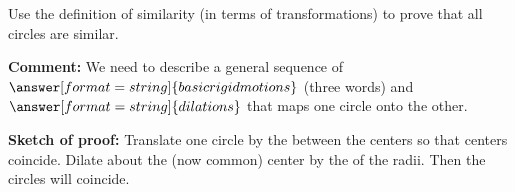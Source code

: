 \documentclass[nooutcomes]{ximera}
\begin{document}
%

%

\begin{question}
Use the definition of similarity (in terms of transformations) to prove that all circles are similar.  

\textbf{Comment:} We need to describe a general sequence of 
$\answer[format=string]{basic rigid motions}$ 
(three words) and $\answer[format=string]{dilations}$ that maps one circle onto the other.  

\begin{question}
\textbf{Sketch of proof:}  Translate one circle by the 
between the centers so that centers coincide.  Dilate about the (now common) center by the 
of the radii.  Then the circles will coincide.  
\end{question}
\end{question}
\end{document}
